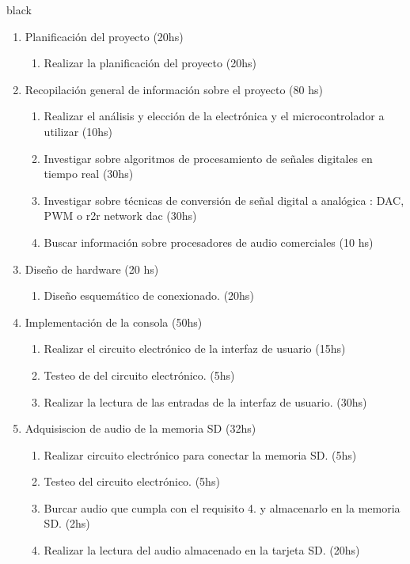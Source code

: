 \documentclass[11pt]{charter}
\begin{document}
\begin{consigna}{black}

\begin{enumerate}
\item Planificación del proyecto (20hs)
	\begin{enumerate}
	\item Realizar la planificación del proyecto (20hs)
	\end{enumerate}
\item Recopilación general de información sobre el proyecto (80 hs)
	\begin{enumerate}
	\item Realizar el análisis y elección de la electrónica y el microcontrolador a utilizar (10hs)
	\item Investigar sobre algoritmos de procesamiento de señales digitales en tiempo real (30hs)
	\item Investigar sobre técnicas de conversión de señal digital a analógica : DAC, PWM o r2r network 		dac (30hs)
	\item Buscar información sobre procesadores de audio comerciales (10 hs)
	\end{enumerate}
\item Diseño de hardware (20 hs)
	\begin{enumerate}
	\item Diseño esquemático de conexionado. (20hs)
	\end{enumerate}
\item Implementación de la consola (50hs)
	\begin{enumerate}
	\item Realizar el circuito electrónico de la interfaz de usuario (15hs)
	\item Testeo de del circuito electrónico. (5hs)
	\item Realizar la lectura de las entradas de la interfaz de usuario. (30hs)
	\end{enumerate}
\item Adquisiscion de audio de la memoria SD (32hs)
	\begin{enumerate}
	\item Realizar circuito electrónico para conectar la memoria SD. (5hs)
	\item Testeo del circuito electrónico. (5hs)
	\item Burcar audio que cumpla con el requisito 4. y almacenarlo en la memoria SD. (2hs)
	\item Realizar la lectura del audio almacenado en la tarjeta SD. (20hs)

\end{enumerate}
\end{enumerate}
\end{consigna}
\end{document}
